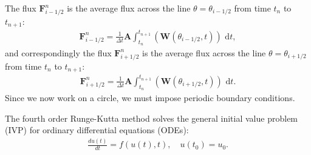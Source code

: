 The flux $\mathbf{F}_{i-1/2}^n$ is the average flux across the line $\theta = \theta_{i-1/2}$ from time $t_n$ to $t_{n+1}$:
\begin{align*}
    \mathbf{F}_{i-1/2}^n = \frac{1}{\Delta t} \mathbf{A} \int_{t_n}^{t_{n+1}} (\mathbf{W}(\theta_{i-1/2}, t)) \text{ d}t,
\end{align*}
and correspondingly the flux $\mathbf{F}_{i+1/2}^n$ is the average flux across the line $\theta = \theta_{i+1/2}$ from time $t_n$ to $t_{n+1}$:
\begin{align*}
    \mathbf{F}_{i+1/2}^n = \frac{1}{\Delta t} \mathbf{A} \int_{t_n}^{t_{n+1}} (\mathbf{W}(\theta_{i+1/2}, t)) \text{ d}t.
\end{align*}
Since we now work on a circle, we must impose periodic boundary conditions.

The fourth order Runge-Kutta method solves the general initial value problem (IVP) for ordinary differential equations (ODEs):
\begin{align*}
    \frac{d u(t)}{dt} = f(u(t), t), \quad u(t_0) = u_0.
\end{align*}



